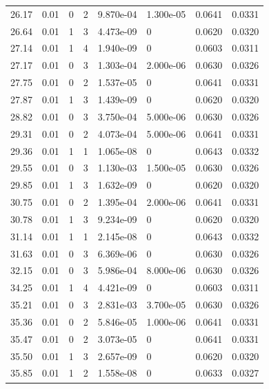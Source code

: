 \documentclass[preview]{standalone}
\begin{document}
{{{\begin{tabular}{L{1.2cm}C{1.2cm} C{0.3cm}C{0.5cm} C{1.4cm}C{1.4cm} C{1.4cm}C{1.4cm}}
  26.17  &  0.01  & 0     &  2 &  9.870e-04  & 1.300e-05  & 0.0641 &  0.0331   \\ 
  26.64  &  0.01  & 1     &  3 &  4.473e-09  & 0  & 0.0620 &  0.0320   \\ 
  27.14  &  0.01  & 1     &  4 &  1.940e-09  & 0  & 0.0603 &  0.0311   \\ 
  27.17  &  0.01  & 0     &  3 &  1.303e-04  & 2.000e-06  & 0.0630 &  0.0326   \\ 
  27.75  &  0.01  & 0     &  2 &  1.537e-05  & 0  & 0.0641 &  0.0331   \\ 
  27.87  &  0.01  & 1     &  3 &  1.439e-09  & 0  & 0.0620 &  0.0320   \\ 
  28.82  &  0.01  & 0     &  3 &  3.750e-04  & 5.000e-06  & 0.0630 &  0.0326   \\ 
  29.31  &  0.01  & 0     &  2 &  4.073e-04  & 5.000e-06  & 0.0641 &  0.0331   \\ 
  29.36  &  0.01  & 1     &  1 &  1.065e-08  & 0  & 0.0643 &  0.0332   \\ 
  29.55  &  0.01  & 0     &  3 &  1.130e-03  & 1.500e-05  & 0.0630 &  0.0326   \\ 
  29.85  &  0.01  & 1     &  3 &  1.632e-09  & 0  & 0.0620 &  0.0320   \\ 
  30.75  &  0.01  & 0     &  2 &  1.395e-04  & 2.000e-06  & 0.0641 &  0.0331   \\ 
  30.78  &  0.01  & 1     &  3 &  9.234e-09  & 0  & 0.0620 &  0.0320   \\ 
  31.14  &  0.01  & 1     &  1 &  2.145e-08  & 0  & 0.0643 &  0.0332   \\ 
  31.63  &  0.01  & 0     &  3 &  6.369e-06  & 0  & 0.0630 &  0.0326   \\ 
  32.15  &  0.01  & 0     &  3 &  5.986e-04  & 8.000e-06  & 0.0630 &  0.0326   \\ 
  34.25  &  0.01  & 1     &  4 &  4.421e-09  & 0  & 0.0603 &  0.0311   \\ 
  35.21  &  0.01  & 0     &  3 &  2.831e-03  & 3.700e-05  & 0.0630 &  0.0326   \\ 
  35.36  &  0.01  & 0     &  2 &  5.846e-05  & 1.000e-06  & 0.0641 &  0.0331   \\ 
  35.47  &  0.01  & 0     &  2 &  3.073e-05  & 0  & 0.0641 &  0.0331   \\ 
  35.50  &  0.01  & 1     &  3 &  2.657e-09  & 0  & 0.0620 &  0.0320   \\ 
  35.85  &  0.01  & 1     &  2 &  1.558e-08  & 0  & 0.0633 &  0.0327   \\ 

\end{tabular}}}}
\end{document}
